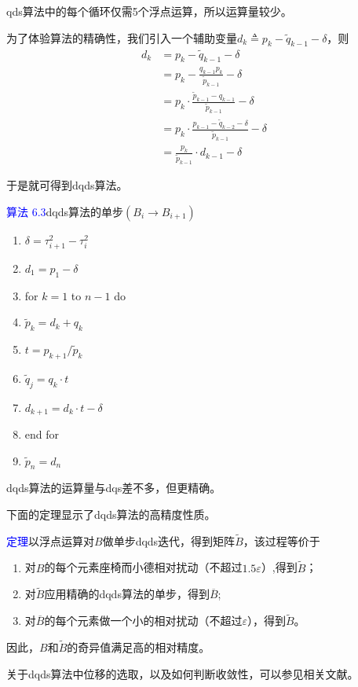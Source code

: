 \documentclass[notheorems,serif]{beamer}
\begin{document}
\begin{frame}

qds算法中的每个循环仅需5个浮点运算，所以运算量较少。

为了体验算法的精确性，我们引入一个辅助变量$d_{k} \triangleq p_{k}-\tilde{q}_{k-1}-\delta$，则
$$
\begin{aligned} d_{k} &=p_{k}-\tilde{q}_{k-1}-\delta \\ &=p_{k}-\frac{q_{k-1} p_{k}}{\tilde{p}_{k-1}}-\delta \\ &=p_{k} \cdot \frac{\tilde{p}_{k-1}-q_{k-1}}{\tilde{p}_{k-1}}-\delta \\ &=p_{k} \cdot \frac{p_{k-1}-\tilde{q}_{k-2}-\delta}{\tilde{p}_{k-1}}-\delta \\ &=\frac{p_{k}}{\tilde{p}_{k-1}} \cdot d_{k-1}-\delta \end{aligned}
$$

于是就可得到dqds算法。
\end{frame}
\begin{frame}

\textcolor{blue}{算法 6.3}\quad dqds算法的单步$\left(B_{i} \rightarrow B_{i+1}\right)$
\begin{enumerate}[1:]
	\item $\delta=\tau_{i+1}^{2}-\tau_{i}^{2}$
	\item $d_{1}=p_{1}-\delta$
	\item for $k=1$ to $n-1$ do
	\item \quad $\tilde{p}_{k}=d_{k}+q_{k}$
	\item \quad $t=p_{k+1} / \tilde{p}_{k}$
	\item \quad $\tilde{q}_{j}=q_{k} \cdot t$
	\item \quad $d_{k+1}=d_{k} \cdot t-\delta$
	\item end for 
	\item $\tilde{p}_{n}=d_{n}$
\end{enumerate}

dqds算法的运算量与dqs差不多，但更精确。
\end{frame}
\begin{frame}

下面的定理显示了dqds算法的高精度性质。

\textcolor{blue}{定理}\quad 以浮点运算对$B$做单步dqds迭代，得到矩阵$\tilde{B}$，该过程等价于
\begin{enumerate}[1.]
	\item 对$B$的每个元素座椅而小德相对扰动（不超过$1.5\varepsilon$）,得到$\tilde{B}$；
	\item 对$\tilde{B}$应用精确的dqds算法的单步，得到$\overline{B}$;
	\item 对$\overline{B}$的每个元素做一个小的相对扰动（不超过$\varepsilon$），得到$\tilde{B}$。
\end{enumerate}

因此，$B$和$\tilde{B}$的奇异值满足高的相对精度。

关于dqds算法中位移的选取，以及如何判断收敛性，可以参见相关文献。
\end{frame}
\end{document}
